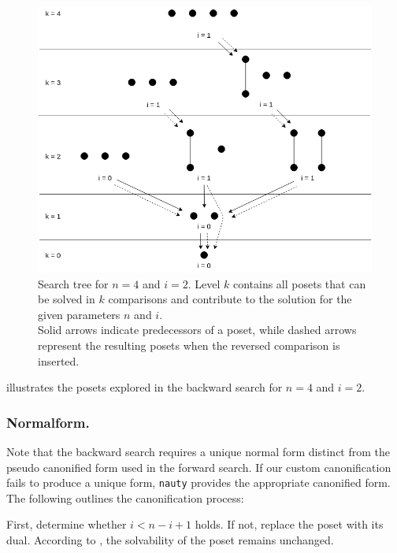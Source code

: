 \documentclass[twoside,leqno,twocolumn]{article}
\begin{document}
\begin{figure}[!b]
  \centering
  \includegraphics[width=\columnwidth]{figures/backward-search-tree.png} 
  \caption{Search tree for $n = 4$ and $i = 2$.
    Level $k$ contains all posets that can be solved in $k$ comparisons and contribute to the solution for the given parameters $n$ and $i$. \\
    Solid arrows indicate predecessors of a poset, while dashed arrows represent the resulting posets when the reversed comparison is inserted.}
  \label{fig:backward-search-tree}
\end{figure}

 illustrates the posets explored in the backward search for $n = 4$ and $i = 2$.

\subsubsection{Normalform.} \label{sec:backward:normal_form}
Note that the backward search requires a unique normal form distinct from the pseudo canonified form used in the forward search.
If our custom canonification fails to produce a unique form, \texttt{nauty} provides the appropriate canonified form.
The following outlines the canonification process:

First, determine whether $i < n - i + 1$ holds.
If not, replace the poset with its dual.
According to , the solvability of the poset remains unchanged.
\end{document}

